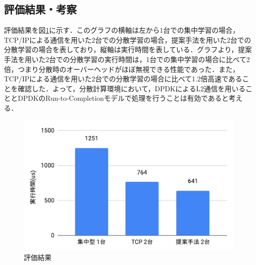 \subsection{評価結果・考察}
評価結果を図\ref{fig:EvaluationResult}に示す．このグラフの横軸は左から1台での集中学習の場合，TCP/IPによる通信を用いた2台での分散学習の場合，提案手法を用いた2台での分散学習の場合を表しており，縦軸は実行時間を表している．グラフより，提案手法を用いた2台での分散学習の実行時間は，1台での集中学習の場合に比べて2倍，つまり分散時のオーバーヘッドがほぼ無視できる性能であった．また，TCP/IPによる通信を用いた2台での分散学習の場合に比べて1.2倍高速であることを確認した．よって，分散計算環境において，DPDKによるL2通信を用いることとDPDKのRun-to-Completionモデルで処理を行うことは有効であると考える．

\begin{figure}[htb]
  \centering
  \includegraphics[width=\columnwidth]{pictures/EvaluationResult.pdf}
  \caption{評価結果}
  \label{fig:EvaluationResult}
\end{figure}
